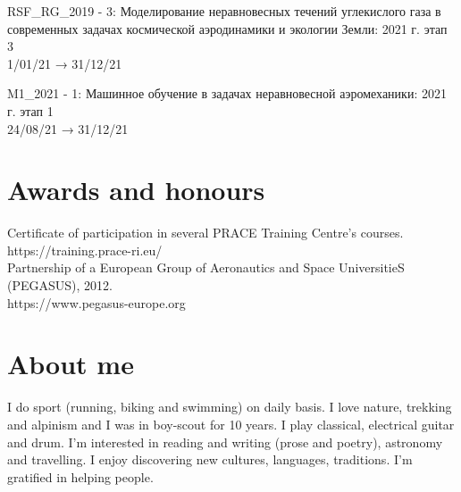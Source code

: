 \documentclass[11pt]{res} %
\begin{document}
\begin{resume}
RSF\_RG\_2019 - 3: Моделирование неравновесных течений углекислого газа в современных задачах космической аэродинамики и экологии Земли: 2021 г. этап 3 \\
1/01/21 → 31/12/21

M1\_2021 - 1: Машинное обучение в задачах неравновесной аэромеханики: 2021 г. этап 1 \\
24/08/21 → 31/12/21


\section{{Awards and honours}}

Certificate of participation in several PRACE Training Centre's courses. 
\\ https://training.prace-ri.eu/\\

\vspace{-20pt}
Partnership of a European Group of Aeronautics and Space UniversitieS (PEGASUS), 2012. \\
https://www.pegasus-europe.org


\section{{About me}} 

I do sport (running, biking and swimming) on daily basis. I love nature, trekking and alpinism and I was in boy-scout for 10 years. I play classical, electrical guitar and drum.
I'm interested in reading and writing (prose and poetry), astronomy and travelling. I enjoy discovering new cultures, languages, traditions. I'm gratified in helping people.


\end{resume} 
\end{document}
